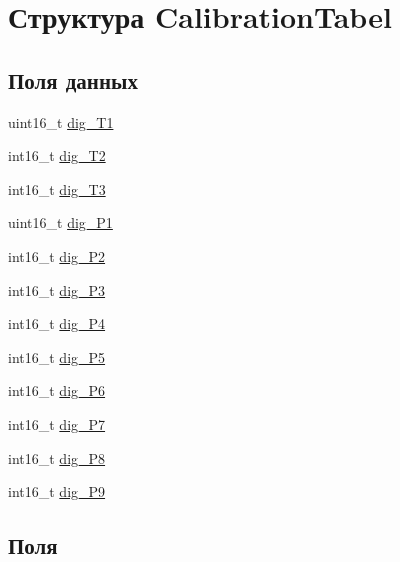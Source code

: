 \hypertarget{struct_calibration_tabel}{}\section{Структура Calibration\+Tabel}
\label{struct_calibration_tabel}
\subsection*{Поля данных}
\begin{DoxyCompactItemize}
\item 
uint16\+\_\+t \mbox{\hyperlink{struct_calibration_tabel_aaea397a78e8bcd5be0dcad2d1c9d54a5}{dig\+\_\+\+T1}}
\item 
int16\+\_\+t \mbox{\hyperlink{struct_calibration_tabel_ac6b10ddec5c55773292287f76dfbbff4}{dig\+\_\+\+T2}}
\item 
int16\+\_\+t \mbox{\hyperlink{struct_calibration_tabel_acd78c986f7c42856a8e55e48bc811806}{dig\+\_\+\+T3}}
\item 
uint16\+\_\+t \mbox{\hyperlink{struct_calibration_tabel_a11f098c2f326e85f134df03b852b79df}{dig\+\_\+\+P1}}
\item 
int16\+\_\+t \mbox{\hyperlink{struct_calibration_tabel_ab5371ac8dba4ec8663734f882748eb63}{dig\+\_\+\+P2}}
\item 
int16\+\_\+t \mbox{\hyperlink{struct_calibration_tabel_a90e290b3ba749f87bf1f4d8c1152c08b}{dig\+\_\+\+P3}}
\item 
int16\+\_\+t \mbox{\hyperlink{struct_calibration_tabel_a2d3353a9eeb9d0b258df1d3fae20f832}{dig\+\_\+\+P4}}
\item 
int16\+\_\+t \mbox{\hyperlink{struct_calibration_tabel_a552bda3d95c29031983b7cf7aa76f3ac}{dig\+\_\+\+P5}}
\item 
int16\+\_\+t \mbox{\hyperlink{struct_calibration_tabel_af0da99c23294190bc5df57002d3c9a0f}{dig\+\_\+\+P6}}
\item 
int16\+\_\+t \mbox{\hyperlink{struct_calibration_tabel_ab31d6b02b8485b4d6067560984e54578}{dig\+\_\+\+P7}}
\item 
int16\+\_\+t \mbox{\hyperlink{struct_calibration_tabel_af238e2b4362efbe1d02f02272fcb0e4d}{dig\+\_\+\+P8}}
\item 
int16\+\_\+t \mbox{\hyperlink{struct_calibration_tabel_a9efb86b85c048ba70cfcefc9aea26adf}{dig\+\_\+\+P9}}
\end{DoxyCompactItemize}


\subsection{Поля}
\mbox{\label{struct_calibration_tabel_a11f098c2f326e85f134df03b852b79df}} 
